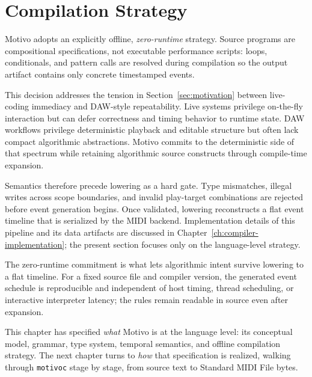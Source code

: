 \section{Compilation Strategy}\label{sec:compilation-strategy}

Motivo adopts an explicitly offline, \textit{zero-runtime} strategy.
Source programs are compositional specifications, not executable performance scripts:
loops, conditionals, and pattern calls are resolved during compilation so the output artifact contains only concrete
timestamped events.

This decision addresses the tension in Section~\ref{sec:motivation} between live-coding immediacy and
DAW-style repeatability.
Live systems privilege on-the-fly interaction but can defer correctness and timing behavior to runtime state.
DAW workflows privilege deterministic playback and editable structure but often lack compact algorithmic abstractions.
Motivo commits to the deterministic side of that spectrum while retaining algorithmic source constructs through
compile-time expansion.

Semantics therefore precede lowering as a hard gate.
Type mismatches, illegal writes across scope boundaries, and invalid play-target combinations are rejected before event
generation begins.
Once validated, lowering reconstructs a flat event timeline that is serialized by the MIDI backend.
Implementation details of this pipeline and its data artifacts are discussed in
Chapter~\ref{ch:compiler-implementation}; the present section focuses only on the language-level strategy.

The zero-runtime commitment is what lets algorithmic intent survive lowering to a flat timeline.
For a fixed source file and compiler version, the generated event schedule is reproducible and independent of
host timing,
thread scheduling, or interactive interpreter latency; the rules remain readable in source even after expansion.

This chapter has specified \emph{what} Motivo is at the language level: its conceptual model, grammar, type system,
temporal semantics, and offline compilation strategy.
The next chapter turns to \emph{how} that specification is realized, walking through \texttt{motivoc} stage by stage,
from source text to Standard MIDI File bytes.
